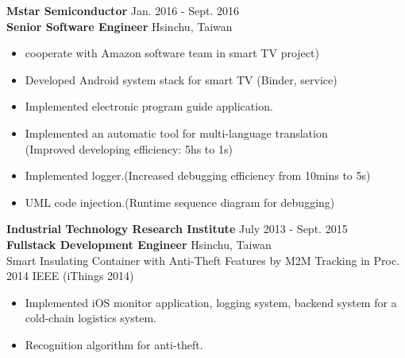 \documentclass{res}
\begin{document}
\begin{resume}
\begin{itemize}[leftmargin=*]
				\end{itemize}
				\vspace{-0.12in}
				{\bf Mstar Semiconductor} 		 {\hfill Jan. 2016 - Sept. 2016}\\
				{\bf Senior Software Engineer}		 {\hfill Hsinchu, Taiwan}

				\begin{itemize}[leftmargin=*]

					\item cooperate with Amazon software team in smart TV project)
					\vspace{-0.05in}	
					\item Developed Android system stack for smart TV (Binder, service)	
					\vspace{-0.05in}
					\item Implemented electronic program guide application.
					\vspace{-0.05in}
					\item Implemented an automatic tool for multi-language translation \\(Improved developing efficiency: 5hs to 1s)
					\vspace{-0.05in}		
					\item Implemented logger.(Increased debugging efficiency from 10mins to 5s)
					\vspace{-0.05in}	
					\item UML code injection.(Runtime sequence diagram for debugging)

				\end{itemize}
				\vspace{-0.12in}
				{\bf Industrial Technology Research Institute } {\hfill July 2013 - Sept. 2015}\\	
				{\bf Fullstack Development Engineer}                        {\hfill Hsinchu, Taiwan}\\
				Smart Insulating Container with Anti-Theft Features by M2M Tracking {\footnotesize in Proc. 2014 IEEE (iThings 2014)}
				\vspace{0.05in}
				\begin{itemize}[leftmargin=*]


					\item Implemented iOS monitor application, logging system, backend system for a cold-chain logistics system.
					\vspace{-0.05in} 
					\item Recognition algorithm for anti-theft.
				\end{itemize}
				\vspace{-0.12in}


\end{resume}
\end{document}
